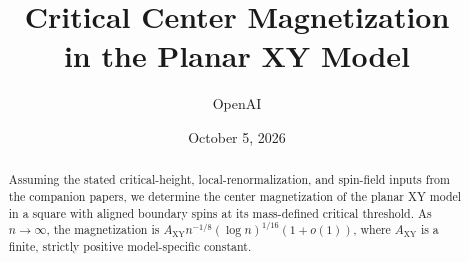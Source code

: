 \documentclass[11pt]{article}
\title{Critical Center Magnetization\\in the Planar XY Model}
\author{OpenAI}
\date{October 5, 2026}
\theoremstyle{definition}
\theoremstyle{remark}
\numberwithin{equation}{section}
\begin{document}
\maketitle
\begin{abstract}
Assuming the stated critical-height, local-renormalization, and spin-field
inputs from the companion papers, we determine the center magnetization
of the planar XY model in a square with aligned boundary spins at its
mass-defined critical threshold. As \(n\to\infty\), the magnetization is
\(A_{\mathrm{XY}}n^{-1/8}(\log n)^{1/16}(1+o(1))\), where
\(A_{\mathrm{XY}}\) is a finite, strictly positive model-specific constant.
\end{abstract}










\end{document}
